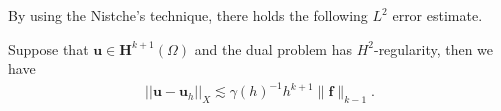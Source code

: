 \documentclass[leqno,CJK]{siamltex704}
\numberwithin{equation}{section}
\def\Q{{\mathcal{Q}}}
\def\dQ{{\mathbb{Q}}}
\def\bPhi{\boldsymbol{\Phi}}            %
\def\sumT{\sum_{T\in\mathcal{T}_h}}     %
\def\bu{{\mathbf{u}}}
\def\bv{{\mathbf{v}}}
\def\bh{{\mathbf{H}}}
\def\bn{{\mathbf{n}}}
\def\be{{\mathbf{e}}}
\def\bf{{\mathbf{f}}}
\newcommand{\eps}{\varepsilon}
\newcommand{\di}{\text{div}}
\newcommand{\la}{\langle}
\newcommand{\ra}{\rangle_{\partial T}}
\begin{document}
By using the Nistche's technique, there holds the following $L^2$ error estimate.
\begin{lemma}\label{Xnorm}
	Suppose that $\bu\in\bh^{k+1}(\Omega)$ and the dual problem has $H^2$-regularity, then we have
	\begin{eqnarray*}
		||\bu-\bu_h||_X\lesssim\gamma(h)^{-1}h^{k+1}\|\bf\|_{k-1}.
	\end{eqnarray*}
\end{lemma}

\end{document}
